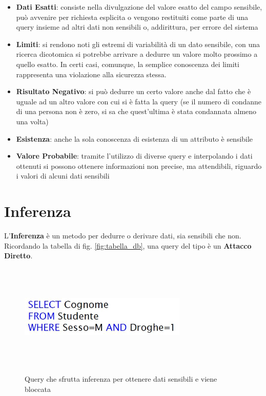 \begin{itemize}

	\item\textbf{Dati Esatti}: consiste nella divulgazione del valore esatto del campo sensibile, può avvenire per richiesta esplicita o vengono restituiti come parte di una query insieme ad altri dati non sensibili o, addirittura, per errore del sistema
	\item \textbf{Limiti}: si rendono noti gli estremi di variabilità di un dato sensibile, con una ricerca dicotomica si potrebbe arrivare a dedurre un valore molto prossimo a quello esatto. In certi casi, comunque, la semplice conoscenza dei limiti rappresenta una violazione alla sicurezza stessa.
	\item \textbf{Risultato Negativo}: si può dedurre un certo valore anche dal fatto che è uguale ad un altro valore con cui si è fatta la query (se il numero di condanne di una persona non è zero, si sa che quest'ultima è stata condannata almeno una volta)
	\item \textbf{Esistenza}: anche la sola conoscenza di esistenza di un attributo è sensibile
	\item \textbf{Valore Probabile}: tramite l'utilizzo di diverse query e interpolando i dati ottenuti si possono ottenere informazioni non precise, ma attendibili, riguardo i valori di alcuni dati sensibili
\end{itemize}

\section{Inferenza}
L'\textbf{Inferenza} è un metodo per dedurre o derivare dati, sia sensibili che non. Ricordando la tabella di fig. \ref{fig:tabella_db}, una query del tipo è un \textbf{Attacco Diretto}.
\begin{figure}[htbp]


	{\includegraphics[height=5cm, width=8cm, keepaspectratio]{Immagini/Appendice1/prot_dati_04.JPG}}
				\caption{Query che sfrutta inferenza per ottenere dati sensibili e viene bloccata \label{fig:query_inferenza}}

\end{figure}

